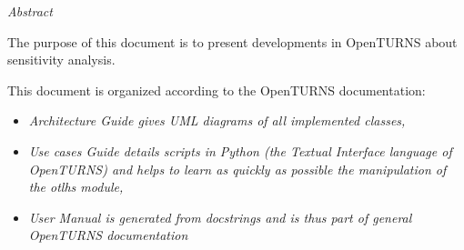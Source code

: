 %

\vspace{0.5in}
\begin{center}
\vspace{0.3in}
\emph{ Abstract}
\vspace{0.5in}
\end{center}

The purpose of this document is to present developments in OpenTURNS about sensitivity analysis.

This document is organized according to the OpenTURNS documentation:
\begin{itemize}
\item \itshape{Architecture Guide} gives UML diagrams of all implemented classes,
\item \itshape{Use cases Guide} details scripts in Python (the Textual Interface language of OpenTURNS) and helps to learn as quickly as possible the manipulation of the \textit{otlhs} module,
\item \itshape{User Manual} is generated from docstrings and is thus part of general OpenTURNS documentation
\end{itemize}

